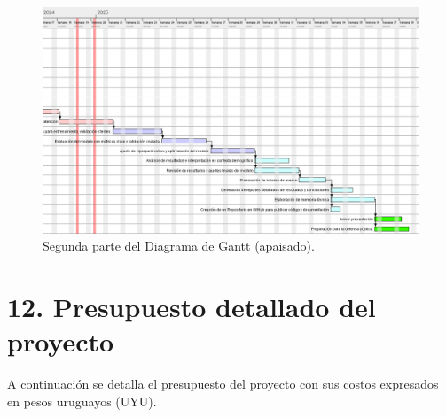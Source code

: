 \documentclass[
11pt, %
]{charter}
\begin{document}
\begin{landscape}
	\vspace*{\fill} %
	\begin{figure}[htpb]
		\centering 
		\includegraphics[height=.7\textheight]{./Figuras/GDPgantt22.png}
		\caption{Segunda parte del Diagrama de Gantt (apaisado).} %
		\label{fig:diagGantt3}
	\end{figure}
	\vspace*{\fill} %
\end{landscape}


\section{12. Presupuesto detallado del proyecto}
\label{sec:presupuesto}

%
%
%

A continuación se detalla el presupuesto del proyecto con sus costos expresados en pesos
uruguayos (UYU). 
\end{document}
